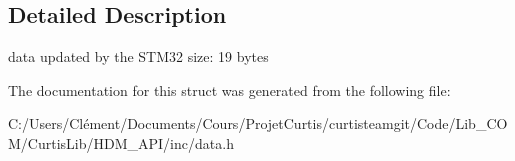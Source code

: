 \subsection{Detailed Description}
data updated by the S\+T\+M32 size\+: 19 bytes 

The documentation for this struct was generated from the following file\+:\begin{DoxyCompactItemize}
\item 
C\+:/\+Users/\+Clément/\+Documents/\+Cours/\+Projet\+Curtis/curtisteamgit/\+Code/\+Lib\+\_\+\+C\+O\+M/\+Curtis\+Lib/\+H\+D\+M\+\_\+\+A\+P\+I/inc/data.\+h\end{DoxyCompactItemize}
